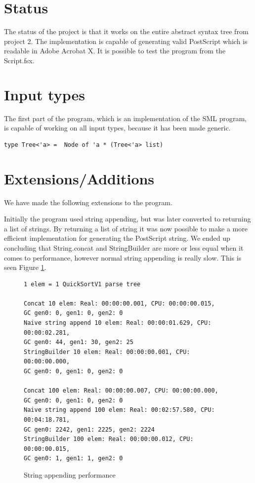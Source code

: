 \documentclass[12pt]{article}
\begin{document}
\clearpage\maketitle
\thispagestyle{empty}

\section{Status}
The status of the project is that it works on the entire abstract syntax tree from project 2. The implementation is capable of generating valid PostScript which is readable in Adobe Acrobat X. It is possible to test the program from the Script.fsx. 

\section{Input types}
The first part of the program, which is an implementation of the SML program, is capable of working on all input types, because it has been made generic. 

\begin{verbatim}
type Tree<'a> =  Node of 'a * (Tree<'a> list)
\end{verbatim}

\section{Extensions/Additions}
We have made the following extensions to the program. 

Initially the program used string appending, but was later converted to returning a list of strings. By returning a list of string it was now possible to make a more efficient implementation for generating the PostScript string. We ended up concluding that String.concat and StringBuilder are more or less equal when it comes to performance, however normal string appending is really slow. This is seen Figure \ref{string_performance}.

\begin{figure}[h]
\begin{verbatim}
1 elem = 1 QuickSortV1 parse tree

Concat 10 elem: Real: 00:00:00.001, CPU: 00:00:00.015, 
GC gen0: 0, gen1: 0, gen2: 0
Naive string append 10 elem: Real: 00:00:01.629, CPU: 00:00:02.281, 
GC gen0: 44, gen1: 30, gen2: 25
StringBuilder 10 elem: Real: 00:00:00.001, CPU: 00:00:00.000, 
GC gen0: 0, gen1: 0, gen2: 0
 
Concat 100 elem: Real: 00:00:00.007, CPU: 00:00:00.000, 
GC gen0: 0, gen1: 0, gen2: 0
Naive string append 100 elem: Real: 00:02:57.580, CPU: 00:04:18.781, 
GC gen0: 2242, gen1: 2225, gen2: 2224
StringBuilder 100 elem: Real: 00:00:00.012, CPU: 00:00:00.015, 
GC gen0: 1, gen1: 1, gen2: 0
\end{verbatim}
\caption{String appending performance}
\label{string_performance}
\end{figure}
\end{document}
